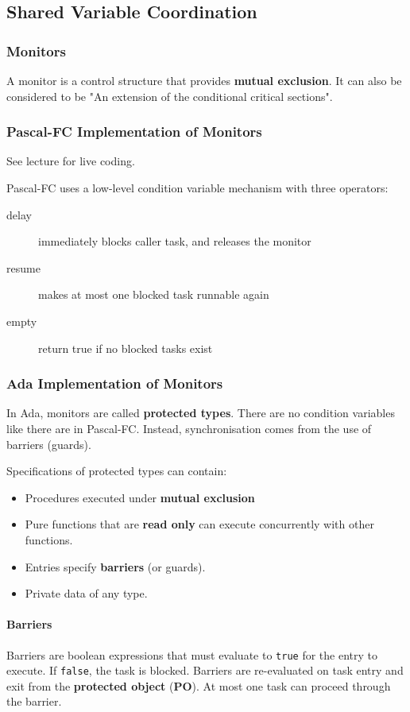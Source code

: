 \documentclass{article}
\begin{document}
\subsection{Shared Variable Coordination}
\label{sec:org76b0c1a}
\subsubsection{Monitors}
\label{sec:orgc6b39f7}
A monitor is a control structure that provides \textbf{mutual exclusion}.
It can also be considered to be "An extension of the conditional critical sections".

\subsubsection{Pascal-FC Implementation of Monitors}
\label{sec:orgc133918}
See lecture for live coding.

Pascal-FC uses a low-level condition variable mechanism with three operators:
\begin{description}
\item[{delay}] immediately blocks caller task, and releases the monitor
\item[{resume}] makes at most one blocked task runnable again
\item[{empty}] return true if no blocked tasks exist
\end{description}

\subsubsection{Ada Implementation of Monitors}
\label{sec:orgae60d96}
In Ada, monitors are called \textbf{protected types}.
There are no condition variables like there are in Pascal-FC.
Instead, synchronisation comes from the use of barriers (guards).

Specifications of protected types can contain:
\begin{itemize}
\item Procedures executed under \textbf{mutual exclusion}
\item Pure functions that are \textbf{read only} can execute concurrently with other functions.
\item Entries specify \textbf{barriers} (or guards).
\item Private data of any type.
\end{itemize}

\paragraph{Barriers}
\label{sec:org2303eb6}
Barriers are boolean expressions that must evaluate to \texttt{true} for the entry to execute.
If \texttt{false}, the task is blocked.
Barriers are re-evaluated on task entry and exit from the \textbf{protected object} (\textbf{PO}).
At most one task can proceed through the barrier.
\end{document}
